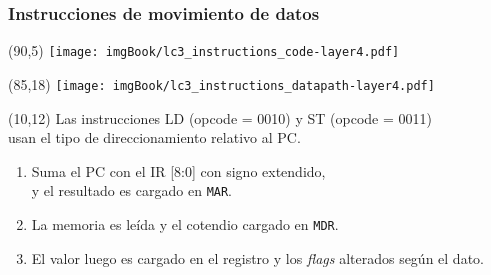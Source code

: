 \documentclass[aspectratio=169]{beamer}
\begin{document}
\begin{frame}[t,fragile]
    \frametitle{Instrucciones de movimiento de datos}
    \begin{textblock}{65}(90,5) \texttt{[image: imgBook/lc3\_instructions\_code-layer4.pdf]} \end{textblock}
    \begin{textblock}{65}(85,18) \texttt{[image: imgBook/lc3\_instructions\_datapath-layer4.pdf]} \end{textblock}
    \begin{textblock}{80}(10,12)
    \small
    Las instrucciones LD (opcode = 0010) y ST (opcode = 0011)\\ usan el tipo de direccionamiento relativo al PC.\\
    \vspace{0.2cm}
    \vspace{0.2cm}
    \vspace{0.2cm}
    \begin{enumerate}
    \item<4-> Suma el PC con el IR [8:0] con signo extendido,\\ y el resultado es cargado en \texttt{MAR}.
    \item<5-> La memoria es leída y el cotendio cargado en \texttt{MDR}.
    \item<6-> El valor luego es cargado en el registro y los \emph{flags} alterados según el dato.
    \end{enumerate}
    \end{textblock}
\end{frame}
\end{document}
